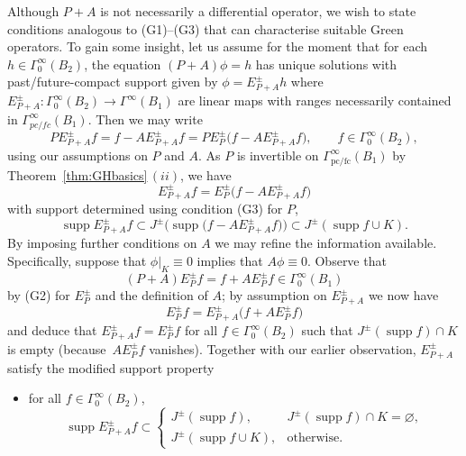 \documentclass[pdftex]{sigma}
\numberwithin{equation}{section}
\newcommand{\GoinX}[1]{\Gamma_0^\infty({#1})}
\newcommand{\fc}{\mathrm{fc}}
\newcommand{\pc}{\mathrm{pc}}
\DeclareMathOperator{\supp}{supp}
\begin{document}
 Although $P+A$ is not necessarily a differential operator, we wish to state conditions analogous to (G1)--(G3) that can characterise suitable Green operators.
 To gain some insight, let us assume for the moment that
 for each $h\in \GoinX{B_2}$, the equation $(P+A)\phi=h$ has unique solutions with past/future-compact support given by $\phi=E_{P+A}^\pm h$ where $E_{P+A}^{\pm}\colon \GoinX{B_2}\to \Gamma^\infty(B_1)$ are linear maps with ranges
 necessarily contained in $\Gamma^\infty_{pc/fc}(B_1)$. Then we may write
 \begin{equation*}
 	PE_{P+A}^\pm f = f- AE_{P+A}^\pm f = PE_P^\pm\big(f- AE_{P+A}^\pm f\big),\qquad f\in \GoinX{B_2},
 \end{equation*}
 using our assumptions on $P$ and $A$. As $P$ is invertible on $\Gamma^\infty_{\pc/\fc}(B_1)$ by Theorem~\ref{thm:GHbasics}\,$(ii)$, we have
 \begin{equation*}
 	E_{P+A}^\pm f = E_P^\pm \big(f-AE_{P+A}^\pm f\big)
 \end{equation*}
 with support determined using condition (G3) for $P$,
 \begin{equation*}
 	\supp E_{P+A}^\pm f \subset J^\pm \big(\supp \big(f-AE_{P+A}^\pm f\big)\big) \subset J^\pm(\supp f\cup K).
 \end{equation*}
 By imposing further conditions on $A$ we may refine the information available. Specifically, suppose that $\phi|_K\equiv 0$ implies that $A\phi\equiv 0$.
 Observe that
 \begin{equation*}
 	(P+A)E_P^\pm f = f+ AE_P^\pm f \in \GoinX{B_1}
 \end{equation*}
 by (G2) for $E_P^\pm$ and the definition of $A$; by assumption on $E^\pm_{P+A}$ we now have
 \begin{equation*}
 	E_P^\pm f = E_{P+A}^\pm \big(f+ AE_P^\pm f\big)
 \end{equation*}
 and deduce that $E_{P+A}^\pm f=E_P^\pm f$ for all $f\in \GoinX{B_2}$ such that
 $J^\pm(\supp f)\cap K$ is empty \big(because~$AE_P^\pm f$ vanishes\big). Together with our earlier observation, $E^\pm_{P+A}$ satisfy the modified support property
 \begin{itemize}\setlength{\leftskip}{0.10cm}
\item[(G3${}'$)] for all $f\in \GoinX{B_2}$,
 	\begin{equation*}\displaystyle \supp E_{P+A}^{\pm} f \subset
 		\begin{cases} J^{\pm}(\supp f), & J^\pm(\supp f)\cap K=\varnothing,\\
 			J^{\pm}(\supp f\cup K), & \text{otherwise.}
 	\end{cases}\end{equation*}
 \end{itemize}
\end{document}
